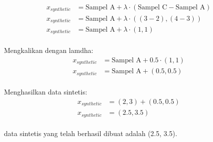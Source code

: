 \begin{align*}
    x_{synthetic} &= \text{Sampel A} + \lambda \cdot (\text{Sampel C} - \text{Sampel A})   \\
    x_{synthetic} &= \text{Sampel A} + \lambda \cdot ((3-2), (4-3)) \\
    x_{synthetic} &= \text{Sampel A} + \lambda \cdot (1,1) 
\end{align*}
\\
Mengkalikan dengan lamdha:
\\
\begin{align*}
    x_{synthetic} &= \text{Sampel A} + 0.5 \cdot (1,1) \\ 
    x_{synthetic} &= \text{Sampel A} + (0.5,0.5) 
\end{align*}
\\
Menghasilkan data sintetis:
\\
\begin{align*}
    x_{synthetic} &= (2,3) + (0.5,0.5) \\
    x_{synthetic} &= (2.5, 3.5) 
\end{align*}
\\
data sintetis yang telah berhasil dibuat adalah (2.5, 3.5).
 
